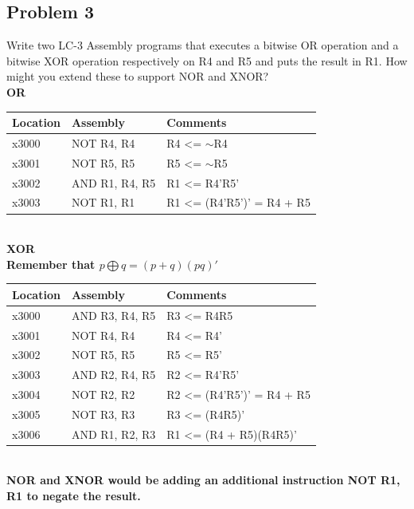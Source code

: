 \documentclass{article}
\begin{document}
\subsection*{Problem 3}
Write two LC-3 Assembly programs that executes a bitwise OR operation and a bitwise XOR operation respectively on R4 and R5 and puts the result in R1. How might you extend these to support NOR and XNOR? \\
\textbf{OR} 
\begin{table}[!h]
\begin{tabular}{|l|l|l|}
\hline
\textbf{Location} & \textbf{Assembly} & \textbf{Comments}                   \\ \hline
x3000             & NOT R4, R4        & R4 \textless{}= $\sim$R4            \\ \hline
x3001             & NOT R5, R5        & R5 \textless{}= $\sim$R5            \\ \hline
x3002             & AND R1, R4, R5    & R1 \textless{}= R4'R5'              \\ \hline
x3003             & NOT R1, R1        & R1 \textless{}= (R4'R5')' = R4 + R5 \\ \hline
\end{tabular}
\end{table}
\\
\textbf{XOR}\\
\textbf{Remember that $p \bigoplus q = (p+q)(pq)'$}
\begin{table}[!h]
\begin{tabular}{|l|l|l|}
\hline
\textbf{Location} & \textbf{Assembly} & \textbf{Comments}                   \\ \hline
x3000             & AND R3, R4, R5    & R3 \textless{}= R4R5                \\ \hline
x3001             & NOT R4, R4        & R4 \textless{}= R4'                 \\ \hline
x3002             & NOT R5, R5        & R5 \textless{}= R5'                 \\ \hline
x3003             & AND R2, R4, R5    & R2 \textless{}= R4'R5'              \\ \hline
x3004             & NOT R2, R2        & R2 \textless{}= (R4'R5')' = R4 + R5 \\ \hline
x3005             & NOT R3, R3        & R3 \textless{}= (R4R5)'             \\ \hline
x3006             & AND R1, R2, R3    & R1 \textless{}= (R4 + R5)(R4R5)'    \\ \hline
\end{tabular}
\end{table}
\\
\textbf{NOR and XNOR would be adding an additional instruction NOT R1, R1 to negate the result.}
\end{document}
